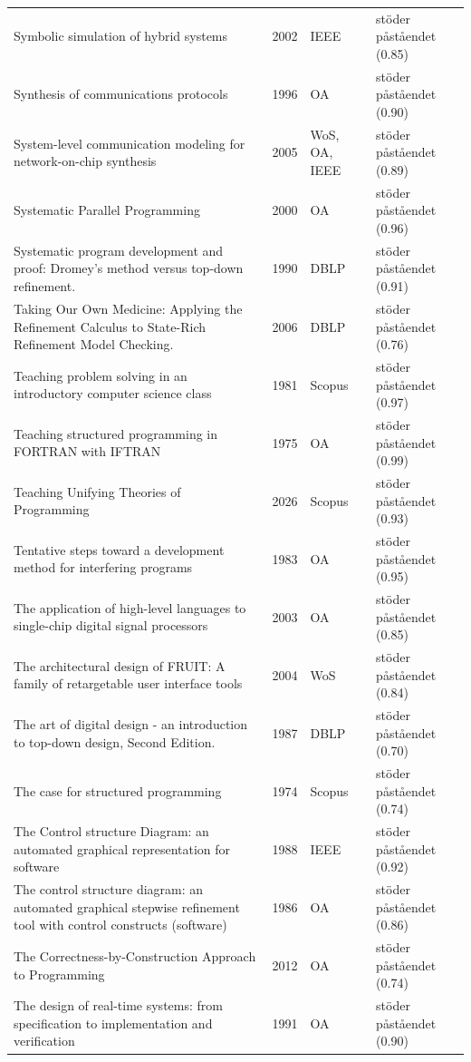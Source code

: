 \begin{longtable}{@{}%
  >{\raggedright\arraybackslash}p{}c%
  >{\raggedright\arraybackslash}p{}%
  >{\raggedright\arraybackslash}p{}@{}}
Symbolic simulation of hybrid systems & 2002 & IEEE & stöder påståendet (0.85) \\
Synthesis of communications protocols & 1996 & OA & stöder påståendet (0.90) \\
System-level communication modeling for network-on-chip synthesis & 2005 & WoS, OA, IEEE & stöder påståendet (0.89) \\
Systematic Parallel Programming & 2000 & OA & stöder påståendet (0.96) \\
Systematic program development and proof: Dromey's method versus top-down refinement. & 1990 & DBLP & stöder påståendet (0.91) \\
Taking Our Own Medicine: Applying the Refinement Calculus to State-Rich Refinement Model Checking. & 2006 & DBLP & stöder påståendet (0.76) \\
Teaching problem solving in an introductory computer science class & 1981 & Scopus & stöder påståendet (0.97) \\
Teaching structured programming in FORTRAN with IFTRAN & 1975 & OA & stöder påståendet (0.99) \\
Teaching Unifying Theories of Programming & 2026 & Scopus & stöder påståendet (0.93) \\
Tentative steps toward a development method for interfering programs & 1983 & OA & stöder påståendet (0.95) \\
The application of high-level languages to single-chip digital signal processors & 2003 & OA & stöder påståendet (0.85) \\
The architectural design of FRUIT: A family of retargetable user interface tools & 2004 & WoS & stöder påståendet (0.84) \\
The art of digital design - an introduction to top-down design, Second Edition. & 1987 & DBLP & stöder påståendet (0.70) \\
The case for structured programming & 1974 & Scopus & stöder påståendet (0.74) \\
The Control structure Diagram: an automated graphical representation for software & 1988 & IEEE & stöder påståendet (0.92) \\
The control structure diagram: an automated graphical stepwise refinement tool with control constructs (software) & 1986 & OA & stöder påståendet (0.86) \\
The Correctness-by-Construction Approach to Programming & 2012 & OA & stöder påståendet (0.74) \\
The design of real-time systems: from specification to implementation and verification & 1991 & OA & stöder påståendet (0.90) \\

\end{longtable}
